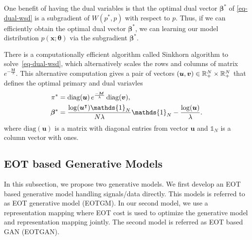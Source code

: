 One benefit of having the dual variables is that the optimal dual vector $\bm{\beta}^{\ast}$
of \eqref{eq-dual-wsd} is a subgradient of $W(p^{\ast},p)$ with respect to $p$. Thus, if we can efficiently obtain the optimal dual vector $\bm{\beta}^{\ast}$, we can learning our model distribution $p(\bm{x}; \bm{\theta})$ via the subgradient $\bm{\beta}^{\ast}$.

There is a computationally efficient algorithm called Sinkhorn
algorithm\cite{2013arXiv1306.0895C, 2013arXiv1310.4375C} to
solve~\eqref{eq-dual-wsd}, which alternatively scales the rows and columns of matrix $e^{-\frac{\bm{M}}{\lambda}}$. This alternative computation gives a pair of vectors $(\bm{u}, \bm{v}) \in \mathbb{R}^N_{+} \times \mathbb{R}^N_{+}$ that defines the optimal primary and dual variavles \cite[Proposition~2]{2013arXiv1310.4375C} 
\begin{align}\label{eq-dual-opt}
  \pi^{\ast} &=
               \mathrm{diag}(\bm{u}) \, e^{\frac{-\bm{M}}{\la}} \, \mathrm{diag}(\bm{v}),  \nonumber \\
  \bm{\beta}^{\ast} &= \frac{\log(\bm{u}^{\intercal})\mathds{1}_N}{N\la} \mathds{1}_N -\frac{\log(\bm{u})}{\la}.
\end{align}
where $\mathrm{diag}(\bm{u})$ is a matrix with diagonal entries from vector $\bm{u}$ and $\mathds{1}_N$ is a column vector with ones.


\subsection{EOT based Generative Models}

In this subsection, we propose two generative models.
We first develop an EOT based generative model handling signals/data directly. This models is referred to as EOT generative model (EOTGM). 
In our second model, we use a
representation mapping where EOT cost is used to optimize the
generative model and representation mapping jointly. The second model is referred as EOT based GAN (EOTGAN).
\vspace{-3pt}
